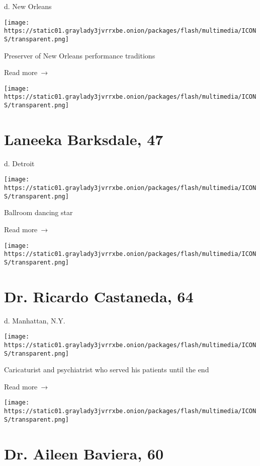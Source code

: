 d. New Orleans

\texttt{[image: https://static01.graylady3jvrrxbe.onion/packages/flash/multimedia/ICONS/transparent.png]}

Preserver of New Orleans performance traditions

 Read more~→

\href{https://www.nytimes3xbfgragh.onion/2020/04/09/us/laneeka-barksdale-dead-coronavirus.html}{}

\texttt{[image: https://static01.graylady3jvrrxbe.onion/packages/flash/multimedia/ICONS/transparent.png]}

\hypertarget{laneeka-barksdale-47}{%
\section{Laneeka Barksdale, 47}\label{laneeka-barksdale-47}}

d. Detroit

\texttt{[image: https://static01.graylady3jvrrxbe.onion/packages/flash/multimedia/ICONS/transparent.png]}

Ballroom dancing star

 Read more~→

\href{https://www.nytimes3xbfgragh.onion/2020/04/09/obituaries/ricardo-castaneda-dead-coronavirus.html}{}

\texttt{[image: https://static01.graylady3jvrrxbe.onion/packages/flash/multimedia/ICONS/transparent.png]}

\hypertarget{dr-ricardo-castaneda-64}{%
\section{Dr. Ricardo Castaneda, 64}\label{dr-ricardo-castaneda-64}}

d. Manhattan, N.Y.

\texttt{[image: https://static01.graylady3jvrrxbe.onion/packages/flash/multimedia/ICONS/transparent.png]}

Caricaturist and psychiatrist who served his patients until the end

 Read more~→

\href{https://www.nytimes3xbfgragh.onion/2020/04/09/obituaries/aileen-baviera-dead-coronavirus.html}{}

\texttt{[image: https://static01.graylady3jvrrxbe.onion/packages/flash/multimedia/ICONS/transparent.png]}

\hypertarget{dr-aileen-baviera-60}{%
\section{Dr. Aileen Baviera, 60}\label{dr-aileen-baviera-60}}

